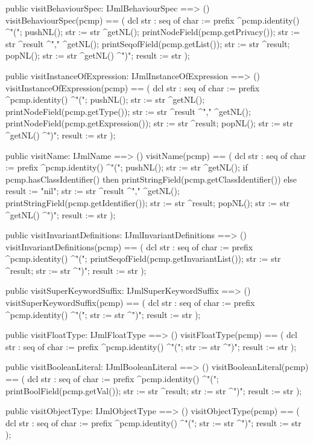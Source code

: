 \begin{vdm_al}
  public visitBehaviourSpec: IJmlBehaviourSpec ==> ()
  visitBehaviourSpec(pcmp) ==
    ( dcl str : seq of char := prefix ^pcmp.identity() ^"(";
      pushNL();
      str := str ^getNL();
      printNodeField(pcmp.getPrivacy());
      str := str ^result ^"," ^getNL();
      printSeqofField(pcmp.getList());
      str := str ^result;
      popNL();
      str := str ^getNL() ^")";
      result := str );

  public visitInstanceOfExpression: IJmlInstanceOfExpression ==> ()
  visitInstanceOfExpression(pcmp) ==
    ( dcl str : seq of char := prefix ^pcmp.identity() ^"(";
      pushNL();
      str := str ^getNL();
      printNodeField(pcmp.getType());
      str := str ^result ^"," ^getNL();
      printNodeField(pcmp.getExpression());
      str := str ^result;
      popNL();
      str := str ^getNL() ^")";
      result := str );

  public visitName: IJmlName ==> ()
  visitName(pcmp) ==
    ( dcl str : seq of char := prefix ^pcmp.identity() ^"(";
      pushNL();
      str := str ^getNL();
      if pcmp.hasClassIdentifier()
      then printStringField(pcmp.getClassIdentifier())
      else result := "nil";
      str := str ^result ^"," ^getNL();
      printStringField(pcmp.getIdentifier());
      str := str ^result;
      popNL();
      str := str ^getNL() ^")";
      result := str );

  public visitInvariantDefinitions: IJmlInvariantDefinitions ==> ()
  visitInvariantDefinitions(pcmp) ==
    ( dcl str : seq of char := prefix ^pcmp.identity() ^"(";
      printSeqofField(pcmp.getInvariantList());
      str := str ^result;
      str := str ^")";
      result := str );

  public visitSuperKeywordSuffix: IJmlSuperKeywordSuffix ==> ()
  visitSuperKeywordSuffix(pcmp) ==
    ( dcl str : seq of char := prefix ^pcmp.identity() ^"(";
      str := str ^")";
      result := str );

  public visitFloatType: IJmlFloatType ==> ()
  visitFloatType(pcmp) ==
    ( dcl str : seq of char := prefix ^pcmp.identity() ^"(";
      str := str ^")";
      result := str );

  public visitBooleanLiteral: IJmlBooleanLiteral ==> ()
  visitBooleanLiteral(pcmp) ==
    ( dcl str : seq of char := prefix ^pcmp.identity() ^"(";
      printBoolField(pcmp.getVal());
      str := str ^result;
      str := str ^")";
      result := str );

  public visitObjectType: IJmlObjectType ==> ()
  visitObjectType(pcmp) ==
    ( dcl str : seq of char := prefix ^pcmp.identity() ^"(";
      str := str ^")";
      result := str );


\end{vdm_al}
